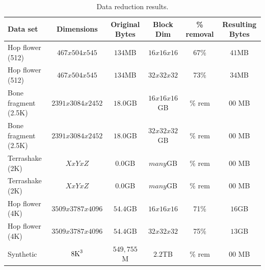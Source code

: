 \documentclass[journal]{vgtc}                %
\begin{document}
\begin{table}[h]
	\caption{Data reduction results.}\label{table:dataReduction}
	\scriptsize
	
	\begin{center}
		
		\begin{tabular}{lccc|cc}
			\textbf{Data set} & \textbf{Dimensions} & \textbf{Original Bytes} & \textbf{Block Dim} & \textbf{\% removal} & \textbf{Resulting Bytes} \\
			
			\hline
			
			Hop flower  (512)  &  $467x504x545$     &  $134$MB       & $16x16x16$    & 67\% &  $41$MB \\
	        Hop flower  (512)  &  $467x504x545$     &  $134$MB       & $32x32x32$   &  73\% & $34$MB \\
	        
	        Bone fragment (2.5K)  &  $2391x3084x2452$  & $18.0$GB    & $16x16x16$GB   & \% rem &  $00$ MB \\
			Bone fragment (2.5K)  &  $2391x3084x2452$  & $18.0$GB    & $32x32x32$GB    & \% rem &  $00$ MB \\

			Terrashake (2K)&  $XxYxZ$  & $0.0$GB    & $many$GB  & \% rem &  $00$ MB \\
			Terrashake (2K)&  $XxYxZ$  & $0.0$GB    & $many$GB  & \% rem &  $00$ MB \\

			Hop flower (4K) & $3509x3787x4096$   & $54.4$GB     & $16x16x16$     & 71\%    & $16$GB \\
			Hop flower (4K) & $3509x3787x4096$   & $54.4$GB      & $32x32x32$   & 75\%    & $13$GB \\

			Synthetic          &  $8\textnormal{K}^3$  & $549,755$M & $2.2$TB        & \% rem &  $00$ MB \\
		\end{tabular}
		
	\end{center}
	
\end{table}
\end{document}
